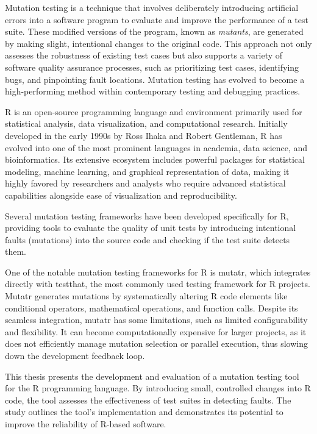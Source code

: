 \begin{chapterabstract}
\end{chapterabstract}

Mutation testing is a technique that involves deliberately introducing artificial errors into a software program to evaluate and improve the performance of a test suite. These modified versions of the program, known as 
\textit{mutants}, are generated by making slight, intentional changes to the original code. This approach not only assesses the robustness of existing test cases but also supports a variety of software quality assurance 
processes, such as prioritizing test cases, identifying bugs, and pinpointing fault locations. Mutation testing has evolved to become a high-performing method within contemporary testing and debugging practices.

R\cite{R-base} is an open-source programming language and environment primarily used for statistical analysis, data visualization, and computational research. Initially developed in the early 1990s by Ross Ihaka and Robert 
Gentleman, R has evolved into one of the most prominent languages in academia, data science, and bioinformatics. Its extensive ecosystem includes powerful packages for statistical modeling, machine learning, and graphical 
representation of data, making it highly favored by researchers and analysts who require advanced statistical capabilities alongside ease of visualization and reproducibility.

Several mutation testing frameworks have been developed specifically for R, providing tools to evaluate the quality of unit tests by introducing intentional faults (mutations) into the source code and checking if the test 
suite detects them.

One of the notable mutation testing frameworks for R is mutatr, which integrates directly with testthat\cite{wickham2011testthat}, the most commonly used testing framework for R projects. Mutatr\cite{wickham_mutatr} 
generates mutations by systematically altering R code elements like conditional operators, mathematical operations, and function calls. Despite its seamless integration, mutatr has some limitations, such as limited 
configurability and flexibility. It can become computationally expensive for larger projects, as it does not efficiently manage mutation selection or parallel execution, thus slowing down the development feedback loop.

This thesis presents the development and evaluation of a mutation testing tool for the R programming language. By introducing small, controlled changes into R code, the tool assesses the effectiveness of test suites in 
detecting faults. The study outlines the tool’s implementation and demonstrates its potential to improve the reliability of R-based software.